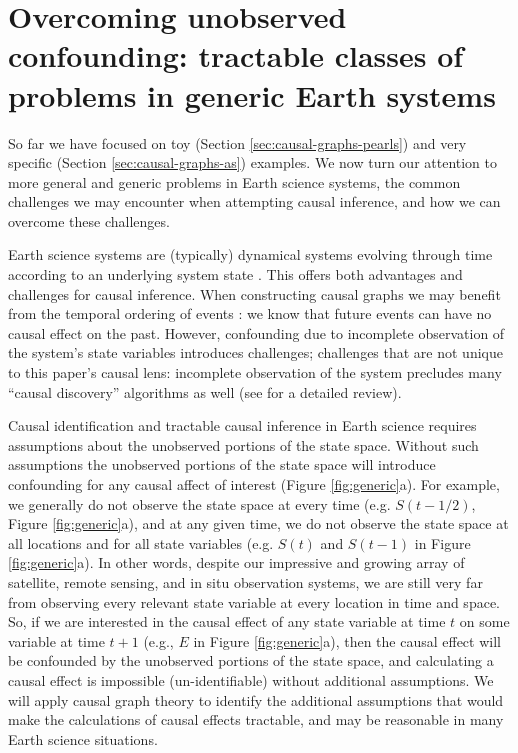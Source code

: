\documentclass[12pt]{article}
\begin{document}
\section{Overcoming unobserved confounding: tractable classes of
  problems in generic Earth systems}
\label{sec:necess-cond-caus}

So far we have focused on toy (Section \ref{sec:causal-graphs-pearls})
and very specific (Section \ref{sec:causal-graphs-as}) examples. We
now turn our attention to more general and generic problems in Earth
science systems, the common challenges we may encounter when
attempting causal inference, and how we can overcome these challenges.

Earth science systems are (typically) dynamical systems evolving
through time according to an underlying system state
\citep{lorenz-1963,lorenz1996predictability,majda-state}. This offers
both advantages and challenges for causal inference. When constructing
causal graphs we may benefit from the temporal ordering of events
\citep{runge2019inferring}: we know that future events can have no
causal effect on the past. However, confounding due to incomplete
observation of the system's state variables introduces challenges;
challenges that are not unique to this paper's causal lens: incomplete
observation of the system precludes many ``causal discovery''
algorithms as well (see \citet{runge2019inferring} for a detailed
review).

Causal identification and tractable causal inference in Earth science
requires assumptions about the unobserved portions of the state
space. Without such assumptions the unobserved portions of the state
space will introduce confounding for any causal affect of interest
(Figure \ref{fig:generic}a). For example, we generally do not observe
the state space at every time (e.g. $S(t-1/2)$, Figure
\ref{fig:generic}a), and at any given time, we do not observe the
state space at all locations and for all state variables (e.g. $S(t)$
and $S(t-1)$ in Figure \ref{fig:generic}a). In other words, despite
our impressive and growing array of satellite, remote sensing, and in
situ observation systems, we are still very far from observing every
relevant state variable at every location in time and space.  So, if
we are interested in the causal effect of any state variable at time
$t$ on some variable at time $t+1$ (e.g., $E$ in Figure
\ref{fig:generic}a), then the causal effect will be confounded by the
unobserved portions of the state space, and calculating a causal
effect is impossible (un-identifiable) without additional
assumptions. We will apply causal graph theory to identify the
additional assumptions that would make the calculations of causal
effects tractable, and may be reasonable in many Earth science
situations.
\end{document}
